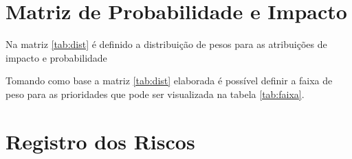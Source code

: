\section{Matriz de Probabilidade e Impacto}

Na matriz \ref{tab:dist} é definido a distribuição de pesos para as atribuições de impacto e probabilidade

\begin{table}[!h]
\centering
\caption{Distribuição dos pesos entre impacto e probabilidade}
\label{tab:dist}
\end{table}

Tomando como base a matriz \ref{tab:dist} elaborada é possível definir a faixa de peso para as prioridades que pode ser visualizada na tabela \ref{tab:faixa}.

\begin{table}[!h]
\centering
\caption{Faixa de peso para prioridades}
\label{tab:faixa}
\end{table}

\section{Registro dos Riscos}

